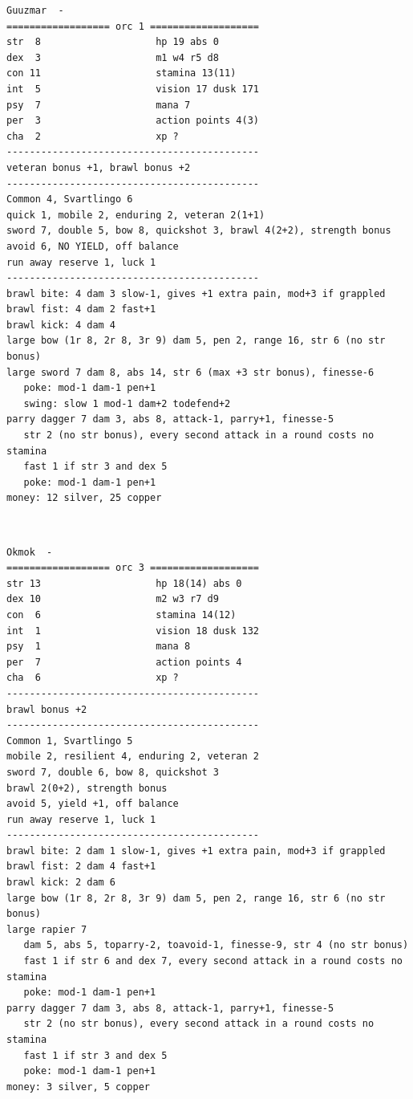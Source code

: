 \goodbreak
\begin{samepage} \small \begin{verbatim}
Guuzmar  -
================== orc 1 ===================
str  8                    hp 19 abs 0
dex  3                    m1 w4 r5 d8
con 11                    stamina 13(11)
int  5                    vision 17 dusk 171
psy  7                    mana 7
per  3                    action points 4(3)
cha  2                    xp ?
--------------------------------------------
veteran bonus +1, brawl bonus +2
--------------------------------------------
Common 4, Svartlingo 6
quick 1, mobile 2, enduring 2, veteran 2(1+1)
sword 7, double 5, bow 8, quickshot 3, brawl 4(2+2), strength bonus
avoid 6, NO YIELD, off balance
run away reserve 1, luck 1
--------------------------------------------
brawl bite: 4 dam 3 slow-1, gives +1 extra pain, mod+3 if grappled
brawl fist: 4 dam 2 fast+1
brawl kick: 4 dam 4
large bow (1r 8, 2r 8, 3r 9) dam 5, pen 2, range 16, str 6 (no str bonus)
large sword 7 dam 8, abs 14, str 6 (max +3 str bonus), finesse-6
   poke: mod-1 dam-1 pen+1
   swing: slow 1 mod-1 dam+2 todefend+2
parry dagger 7 dam 3, abs 8, attack-1, parry+1, finesse-5
   str 2 (no str bonus), every second attack in a round costs no stamina
   fast 1 if str 3 and dex 5
   poke: mod-1 dam-1 pen+1
money: 12 silver, 25 copper
\end{verbatim} \normalsize \end{samepage}

\


\goodbreak
\begin{samepage} \small \begin{verbatim}
Okmok  -
================== orc 3 ===================
str 13                    hp 18(14) abs 0
dex 10                    m2 w3 r7 d9
con  6                    stamina 14(12)
int  1                    vision 18 dusk 132
psy  1                    mana 8
per  7                    action points 4
cha  6                    xp ?
--------------------------------------------
brawl bonus +2
--------------------------------------------
Common 1, Svartlingo 5
mobile 2, resilient 4, enduring 2, veteran 2
sword 7, double 6, bow 8, quickshot 3
brawl 2(0+2), strength bonus
avoid 5, yield +1, off balance
run away reserve 1, luck 1
--------------------------------------------
brawl bite: 2 dam 1 slow-1, gives +1 extra pain, mod+3 if grappled
brawl fist: 2 dam 4 fast+1
brawl kick: 2 dam 6
large bow (1r 8, 2r 8, 3r 9) dam 5, pen 2, range 16, str 6 (no str bonus)
large rapier 7
   dam 5, abs 5, toparry-2, toavoid-1, finesse-9, str 4 (no str bonus)
   fast 1 if str 6 and dex 7, every second attack in a round costs no stamina
   poke: mod-1 dam-1 pen+1
parry dagger 7 dam 3, abs 8, attack-1, parry+1, finesse-5
   str 2 (no str bonus), every second attack in a round costs no stamina
   fast 1 if str 3 and dex 5
   poke: mod-1 dam-1 pen+1
money: 3 silver, 5 copper
\end{verbatim} \normalsize \end{samepage}

